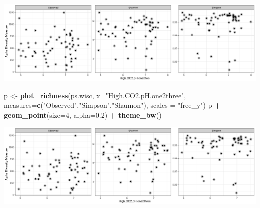 \documentclass[]{article}
\newenvironment{Shaded}{\begin{snugshade}}{\end{snugshade}}
\newcommand{\DataTypeTok}[1]{\textcolor[rgb]{0.13,0.29,0.53}{#1}}
\newcommand{\DecValTok}[1]{\textcolor[rgb]{0.00,0.00,0.81}{#1}}
\newcommand{\FloatTok}[1]{\textcolor[rgb]{0.00,0.00,0.81}{#1}}
\newcommand{\KeywordTok}[1]{\textcolor[rgb]{0.13,0.29,0.53}{\textbf{#1}}}
\newcommand{\NormalTok}[1]{#1}
\newcommand{\OperatorTok}[1]{\textcolor[rgb]{0.81,0.36,0.00}{\textbf{#1}}}
\newcommand{\StringTok}[1]{\textcolor[rgb]{0.31,0.60,0.02}{#1}}
\begin{document}
\includegraphics{output-rmd/richness-ph-High.CO2.pH.one2two.wisc-1.png}

\begin{Shaded}
\begin{Highlighting}[]
\NormalTok{p <-}\StringTok{ }\KeywordTok{plot_richness}\NormalTok{(ps.wisc, }\DataTypeTok{x=}\StringTok{"High.CO2.pH.one2three"}\NormalTok{, }\DataTypeTok{measures=}\KeywordTok{c}\NormalTok{(}\StringTok{"Observed"}\NormalTok{,}\StringTok{"Simpson"}\NormalTok{,}\StringTok{"Shannon"}\NormalTok{), }\DataTypeTok{scales =} \StringTok{"free_y"}\NormalTok{)}
\NormalTok{p }\OperatorTok{+}\StringTok{ }\KeywordTok{geom_point}\NormalTok{(}\DataTypeTok{size=}\DecValTok{4}\NormalTok{, }\DataTypeTok{alpha=}\FloatTok{0.2}\NormalTok{) }\OperatorTok{+}\StringTok{ }\KeywordTok{theme_bw}\NormalTok{()}
\end{Highlighting}
\end{Shaded}

\includegraphics{output-rmd/richness-ph-High.CO2.pH.one2three.wisc-1.png}

\begin{Shaded}
\end{Shaded}
\end{document}

